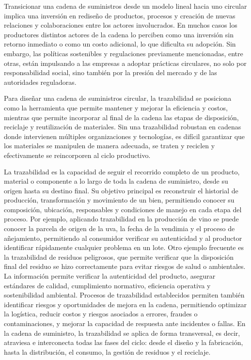 Transicionar una cadena de suministros desde un modelo lineal hacia uno circular implica una inversión en rediseño de productos, procesos y creación de nuevas relaciones y colaboraciones entre los actores involucrados. En muchos casos los productores distintos actores de la cadena lo perciben como una inversión sin retorno inmediato o como un costo adicional, lo que dificulta su adopción. Sin embargo, las políticas sostenibles y regulaciones previamente mencionadas, entre otras, están impulsando a las empresas a adoptar prácticas circulares, no solo por responsabilidad social, sino también por la presión del mercado y de las autoridades reguladoras.

Para diseñar una cadena de suministros circular, la trazabilidad se posiciona como la herramienta que permite mantener y mejorar la eficiencia y costos, mientras que permite incorporar al final de la cadena las etapas de disposición, reciclaje y reutilización de materiales. Sin una trazabilidad robustan en cadenas donde intervienen múltiples organizaciones y tecnologías, es difícil garantizar que los materiales se manipulen de manera adecuada, se traten y reciclen y efectivamente se reincorporen al ciclo productivo.

La trazabilidad es la capacidad de seguir el recorrido completo de un producto, material o componente a lo largo de toda la cadena de suministro, desde su origen hasta su destino final. Su objetivo principal es reconstruir el historial de producción, transformación y movimiento de un bien, permitiendo conocer su composición, ubicación, responsables y condiciones de manejo en cada etapa del proceso. Por ejemplo, aplicando trazabilidad en la producción de vino se puede conocer la parcela de origen de la uva, la fecha de la vendimia y el proceso de añejamiento, permitiendo al consumidor verificar su autenticidad y al productor identificar rápidamente cualquier problema en un lote. Otro ejemplo frecuente es la trazabilidad de residuos peligrosos, que permite verificar que la disposición final del residuo se hizo correctamente para evitar riesgos de salud o ambientales. La información permite verificar la autenticidad del producto, asegurar estándares de calidad, cumplimiento normativo, eficiencia operativa y sostenibilidad ambiental. Procesos de trazabilidad establecidos permiten también identificar riesgos y oportunidades de mejora en la cadena, permitiendo optimizar la logística, reducir costos y riesgos asociados a errores, fraudes o contaminaciones, y mejorar la capacidad de respuesta ante incidentes o fallas. En la cadena de suministro, la trazabilidad se aplica de forma transversal, es decir, atraviesa e interconecta todas las fases del ciclo: desde el diseño y la fabricación, hasta la distribución, el consumo, la gestión de residuos y el reciclaje. 

